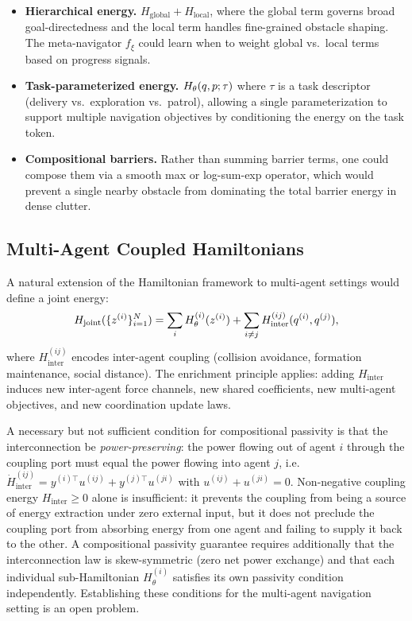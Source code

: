 \begin{itemize}
  \item \textbf{Hierarchical energy.}
        $H_{\mathrm{global}} + H_{\mathrm{local}}$, where the
        global term governs broad goal-directedness and the
        local term handles fine-grained obstacle shaping.
        The meta-navigator $f_\xi$ could learn when to weight
        global vs.\ local terms based on progress signals.
  \item \textbf{Task-parameterized energy.}
        $H_\theta(q,p;\tau)$ where $\tau$ is a task
        descriptor (delivery vs.\ exploration vs.\ patrol),
        allowing a single parameterization to support multiple
        navigation objectives by conditioning the energy on
        the task token.
  \item \textbf{Compositional barriers.}
        Rather than summing barrier terms, one could compose
        them via a smooth max or log-sum-exp operator, which
        would prevent a single nearby obstacle from dominating
        the total barrier energy in dense clutter.
\end{itemize}

\subsection{Multi-Agent Coupled Hamiltonians}
\label{subsec:ch7:multiagent}

A natural extension of the Hamiltonian framework to multi-agent
settings would define a joint energy:
\begin{equation}
  H_{\mathrm{joint}}(\{z^{(i)}\}_{i=1}^N)
  = \sum_i H_\theta^{(i)}(z^{(i)})
    + \sum_{i \neq j} H_{\mathrm{inter}}^{(ij)}(q^{(i)}, q^{(j)}),
  \label{eq:ch7:multiagent_ham}
\end{equation}
where $H_{\mathrm{inter}}^{(ij)}$ encodes inter-agent coupling
(collision avoidance, formation maintenance, social distance).
The enrichment principle applies: adding $H_{\mathrm{inter}}$
induces new inter-agent force channels, new shared coefficients,
new multi-agent objectives, and new coordination update laws.

A necessary but not sufficient condition for compositional passivity
is that the interconnection be \emph{power-preserving}: the power
flowing out of agent $i$ through the coupling port must equal the
power flowing into agent $j$, i.e.\
$\dot H_{\mathrm{inter}}^{(ij)} = y^{(i)\top} u^{(ij)} + y^{(j)\top} u^{(ji)}$
with $u^{(ij)} + u^{(ji)} = 0$.
Non-negative coupling energy $H_{\mathrm{inter}} \geq 0$ alone is
insufficient: it prevents the coupling from being a source of energy
extraction under zero external input, but it does not preclude the
coupling port from absorbing energy from one agent and failing to
supply it back to the other.
A compositional passivity guarantee requires additionally that the
interconnection law is skew-symmetric (zero net power exchange) and
that each individual sub-Hamiltonian $H_\theta^{(i)}$ satisfies its
own passivity condition independently.
Establishing these conditions for the multi-agent navigation setting
is an open problem.

